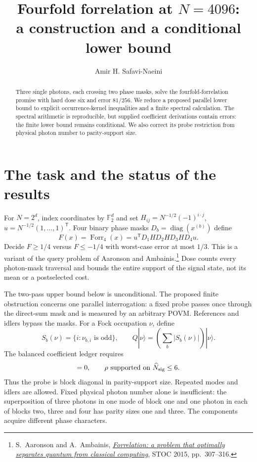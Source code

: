 \documentclass[11pt]{article}
\title{Fourfold forrelation at $N=4096$:\\a construction and a conditional lower bound}
\author{Amir H. Safavi-Naeini}
\date{}
\newcommand{\diag}{\operatorname{diag}}
\newcommand{\Forr}{\operatorname{Forr}_4}
\begin{document}
\maketitle
\begin{abstract}
Three single photons, each crossing two phase masks, solve the
fourfold-forrelation promise with hard dose six and error $81/256$.
We reduce a proposed parallel lower bound to explicit occurrence-kernel
inequalities and a finite spectral calculation. The spectral arithmetic
is reproducible, but supplied coefficient derivations contain errors:
the finite lower bound remains conditional. We also correct its probe
restriction from physical photon number to parity-support size.
\end{abstract}

\section{The task and the status of the results}
For $N=2^d$, index coordinates by $\mathbb F_2^d$ and set
$H_{ij}=N^{-1/2}(-1)^{i\cdot j}$,
$u=N^{-1/2}(1,\ldots,1)^{\mathsf T}$.
Four binary phase masks $D_b=\diag(x^{(b)})$ define
\begin{equation}
 F(x)=\Forr(x)=u^{\mathsf T}D_1HD_2HD_3HD_4u .
 \label{eq:task}
\end{equation}
Decide $F\ge1/4$ versus $F\le-1/4$ with worst-case error at most $1/3$.
This is a variant of the query problem of Aaronson and Ambainis.\footnote{
S.~Aaronson and A.~Ambainis,
\href{https://doi.org/10.1145/2746539.2746547}{\emph{Forrelation:
a problem that optimally separates quantum from classical computing}},
STOC 2015, pp.~307--316.}
Dose counts every photon-mask traversal and bounds the entire support
of the signal state, not its mean or a postselected cost.

The two-pass upper bound below is unconditional.
The proposed finite obstruction concerns one parallel interrogation:
a fixed probe passes once through the direct-sum mask and is measured
by an arbitrary POVM. References and idlers bypass the masks.
For a Fock occupation $\nu$, define
\[
 S_b(\nu)=\{i:\nu_{b,i}\text{ is odd}\},\qquad
 Q|\nu\rangle=\left(\sum_b|S_b(\nu)|\right)|\nu\rangle.
\]
The balanced coefficient ledger requires
\begin{equation}
 [\rho,Q]=0,\qquad
 \rho\text{ supported on }\widehat N_{\rm sig}\le6.
 \label{eq:number}
\end{equation}
Thus the probe is block diagonal in parity-support size. Repeated modes
and idlers are allowed. Fixed physical photon number alone is insufficient:
the superposition of three photons in one mode of block one and one
photon in each of blocks two, three and four has parity sizes one and
three. The components acquire different phase characters.
\end{document}
